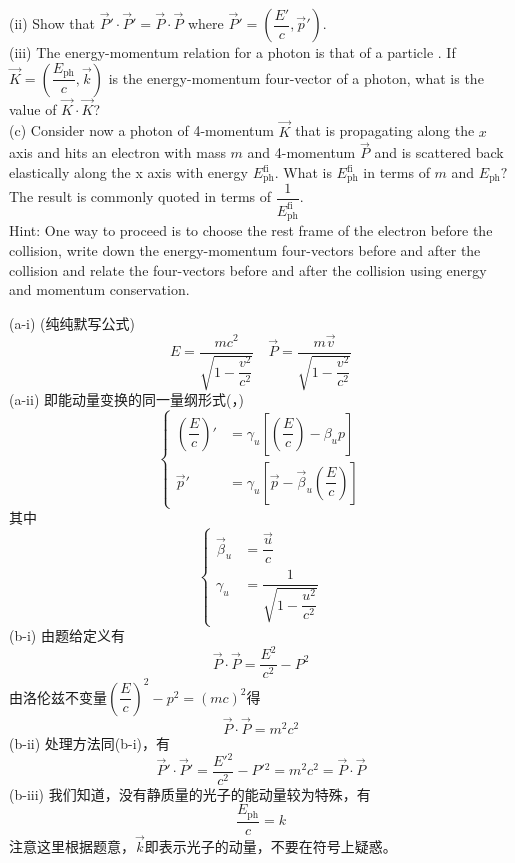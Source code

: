 \begin{solution}
	\hspace*{2em}(ii) Show that $\vec{P}'\cdot\vec{P}'=\vec{P}\cdot\vec{P}$ where $\vec{P}'=(\dfrac{E'}{c},\vec{p}')$.\\
	\hspace*{2em}(iii) The energy-momentum relation for a photon is that of a particle . If $\vec{K} = ( \dfrac{E_{\mathrm{ph}}}{c}, \vec{k} )$ is the energy-momentum four-vector of a photon, what is the value of $\vec{K}\cdot\vec{K}$?\\
	(c) Consider now a photon of 4-momentum $\vec{K}$ that is propagating along the $x$ axis and hits an electron with mass $m$ and 4-momentum $\vec{P}$ and is scattered back elastically along the x axis with energy $E_{\mathrm{ph}}^{\mathrm{fi}}.$ What is $E_\mathrm{ph}^\mathrm{fi}$ in terms of $m$ and $E_\mathrm{ph}?$ The result is commonly quoted in terms of $\dfrac{1}{E_\mathrm{ph}^\mathrm{fi}}$.\\
	Hint: One way to proceed is to choose the rest frame of the electron before the collision, write down the energy-momentum four-vectors before and after the collision and relate the four-vectors before and after the collision using energy and momentum conservation.
	
	\tcbrule
	
(a-i) (纯纯默写公式)
    \[E=\frac{mc^{2}}{\sqrt{1-\dfrac{v^2}{c^{2}}}}\quad\vec{P}=\frac{m\vec{v}}{\sqrt{1-\dfrac{v^2}{c^{2}}}}\]
    (a-ii) 即能动量变换的同一量纲形式(，)
    \[\left\{\begin{aligned}
    	\left(\dfrac{E}{c}\right)'&=\gamma_u\left[\left(\dfrac{E}{c}\right)-\beta_u p\right]\\
    	\vec{p}'&=\gamma_u\left[\vec{p}-\vec{\beta}_u\left(\dfrac{E}{c}\right)\right]
    \end{aligned}\right.\]
    其中
    \[\left\{\begin{aligned}
    	\vec{\beta}_u&=\dfrac{\vec{u}}{c}\\
    	\gamma_u&=\dfrac{1}{\sqrt{1-\dfrac{u^2}{c^2}}}
    \end{aligned}\right.\]
(b-i) 由题给定义有
 \[\vec{P}\cdot \vec{P}= \frac {E^{2}}{c^{2}}- P^{2}\]
由洛伦兹不变量$\left(\dfrac{E}{c}\right)^2-p^2=(mc)^2$得
\[\vec{P}\cdot\vec{P}=m^2c^2\]
 (b-ii) 处理方法同(b-i)，有
\[\vec{P}'\cdot \vec{P}'= \frac {E'{}^{2}}{c^{2}}- P'{}^{2}=m^2c^2=\vec{P}\cdot\vec{P}\]
(b-iii) 我们知道，没有静质量的光子的能动量较为特殊，有
\[\dfrac{E_{\mathrm{ph}}}{c}=k\]
注意这里根据题意，$\vec{k}$即表示光子的动量，不要在符号上疑惑。


\end{solution}
